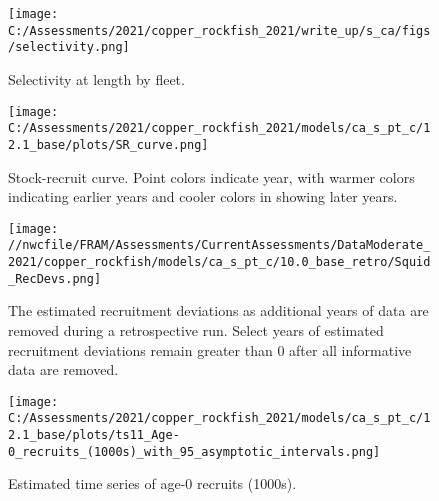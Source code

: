 \documentclass[11pt,
  english,
  a4paper,
]{article}
\begin{document}
\tagmcend\tagstructend


\begin{figure}
\centering
\texttt{[image: C:/Assessments/2021/copper\_rockfish\_2021/write\_up/s\_ca/figs/selectivity.png]}
\caption{Selectivity at length by fleet.\label{fig:selex}}
\end{figure}

\tagmcend\tagstructend


\begin{figure}
\centering
\texttt{[image: C:/Assessments/2021/copper\_rockfish\_2021/models/ca\_s\_pt\_c/12.1\_base/plots/SR\_curve.png]}
\caption{Stock-recruit curve. Point colors indicate year, with warmer colors indicating earlier years and cooler colors in showing later years.\label{fig:bh-curve}}
\end{figure}

\tagmcend\tagstructend


\begin{figure}
\centering
\texttt{[image: //nwcfile/FRAM/Assessments/CurrentAssessments/DataModerate\_2021/copper\_rockfish/models/ca\_s\_pt\_c/10.0\_base\_retro/Squid\_RecDevs.png]}
\caption{The estimated recruitment deviations as additional years of data are removed during a retrospective run. Select years of estimated recruitment deviations remain greater than 0 after all informative data are removed.\label{fig:squid-rec}}
\end{figure}

\tagmcend\tagstructend


\begin{figure}
\centering
\texttt{[image: C:/Assessments/2021/copper\_rockfish\_2021/models/ca\_s\_pt\_c/12.1\_base/plots/ts11\_Age-0\_recruits\_(1000s)\_with\_95\_asymptotic\_intervals.png]}
\caption{Estimated time series of age-0 recruits (1000s).\label{fig:recruits}}
\end{figure}

\tagmcend\tagstructend

\end{document}
